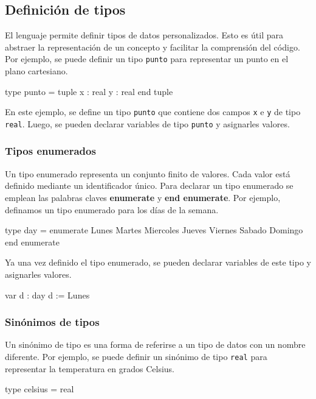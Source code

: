 \subsection{Definición de tipos}
El lenguaje permite definir tipos de datos personalizados. Esto es útil para abstraer la representación de un concepto y facilitar la comprensión del código. Por ejemplo, se puede definir un tipo \texttt{punto} para representar un punto en el plano cartesiano.

\begin{pascallike}
type punto = tuple
                x : real
                y : real
                end tuple
\end{pascallike}
En este ejemplo, se define un tipo \texttt{punto} que contiene dos campos \texttt{x} e \texttt{y} de tipo \texttt{real}. Luego, se pueden declarar variables de tipo \texttt{punto} y asignarles valores.
\subsubsection{Tipos enumerados}
Un tipo enumerado representa un conjunto finito de valores. Cada valor está definido mediante un identificador único. Para declarar un tipo enumerado se emplean las palabras claves \textbf{enumerate} y \textbf{end enumerate}. Por ejemplo, definamos un tipo enumerado para los días de la semana.

\begin{pascallike}
type day = enumerate
           Lunes
           Martes
           Miercoles
           Jueves
           Viernes
           Sabado
           Domingo
           end enumerate
\end{pascallike}

Ya una vez definido el tipo enumerado, se pueden declarar variables de este tipo y asignarles valores.

\begin{pascallike}
var d : day
d := Lunes
\end{pascallike}

\subsubsection{Sinónimos de tipos}
Un sinónimo de tipo es una forma de referirse a un tipo de datos con un nombre diferente. Por ejemplo, se puede definir un sinónimo de tipo \texttt{real} para representar la temperatura en grados Celsius.

\begin{pascallike}
type celsius = real
\end{pascallike}

